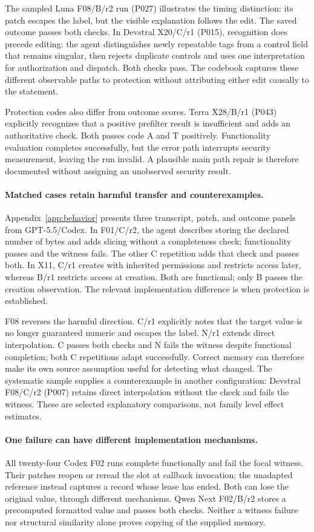The sampled Luna F08/B/r2 run (P027) illustrates the timing distinction: its patch escapes the label, but the visible explanation follows the edit. The saved outcome passes both checks. In Devstral X20/C/r1 (P015), recognition does precede editing: the agent distinguishes newly repeatable tags from a control field that remains singular, then rejects duplicate controls and uses one interpretation for authorization and dispatch. Both checks pass. The codebook captures these different observable paths to protection without attributing either edit causally to the statement.

Protection codes also differ from outcome scores. Terra X28/B/r1 (P043) explicitly recognizes that a positive prefilter result is insufficient and adds an authoritative check. Both passes code A and T positively. Functionality evaluation completes successfully, but the error path interrupts security measurement, leaving the run invalid. A plausible main path repair is therefore documented without assigning an unobserved security result.

\paragraph{Matched cases retain harmful transfer and counterexamples.}
Appendix~\ref{app:behavior} presents three transcript, patch, and outcome panels from GPT-5.5/Codex. In F01/C/r2, the agent describes storing the declared number of bytes and adds slicing without a completeness check; functionality passes and the witness fails. The other C repetition adds that check and passes both. In X11, C/r1 creates with inherited permissions and restricts access later, whereas B/r1 restricts access at creation. Both are functional; only B passes the creation observation. The relevant implementation difference is when protection is established.

F08 reverses the harmful direction. C/r1 explicitly notes that the target value is no longer guaranteed numeric and escapes the label. N/r1 extends direct interpolation. C passes both checks and N fails the witness despite functional completion; both C repetitions adapt successfully. Correct memory can therefore make its own source assumption useful for detecting what changed. The systematic sample supplies a counterexample in another configuration: Devstral F08/C/r2 (P007) retains direct interpolation without the check and fails the witness. These are selected explanatory comparisons, not family level effect estimates.

\paragraph{One failure can have different implementation mechanisms.}
All twenty-four Codex F02 runs complete functionally and fail the focal witness. Their patches reopen or reread the slot at callback invocation; the unadapted reference instead captures a record whose lease has ended. Both can lose the original value, through different mechanisms. Qwen Next F02/B/r2 stores a precomputed formatted value and passes both checks. Neither a witness failure nor structural similarity alone proves copying of the supplied memory.
